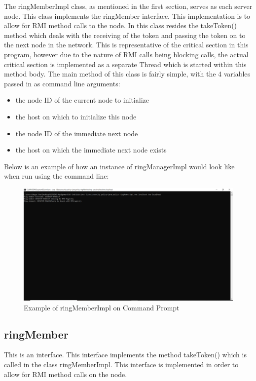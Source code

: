\documentclass[11pt, a4paper]{article}
\begin{document}
The ringMemberImpl class, as mentioned in the first section, serves as each server node. This class implements the ringMember interface. This implementation is to allow for RMI method calls to the node. In this class resides the takeToken() method which deals with the receiving of the token and passing the token on to the next node in the network. This is representative of the critical section in this program, however due to the nature of RMI calls being blocking calls, the actual critical section is implemented as a separate Thread which is started within this method body. The main method of this class is fairly simple, with the 4 variables passed in as command line arguments:
\begin{itemize}
\item the node ID of the current node to initialize
\item the host on which to initialize this node
\item the node ID of the immediate next node
\item the host on which the immediate next node exists
\end{itemize}
Below is an example of how an instance of ringManagerImpl would look like when run using the command line:
\begin{figure}
\centering
\includegraphics[scale=0.35]{ring_memberimpl_example}
\caption{Example of ringMemberImpl on Command Prompt}
\end{figure}

\subsection{ringMember}

This is an interface. This interface implements the method takeToken() which is called in the class ringMemberImpl. This interface is implemented in order to allow for RMI method calls on the node. 
\end{document}
